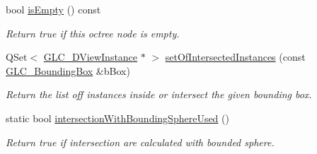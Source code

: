 \begin{DoxyCompactItemize}
bool \hyperlink{class_g_l_c___octree_node_ab70f05f3d3f1a8c5d13fce3a94869f79}{is\-Empty} () const 
\begin{DoxyCompactList}\small\item\em Return true if this octree node is empty. \end{DoxyCompactList}\item 
Q\-Set$<$ \hyperlink{class_g_l_c__3_d_view_instance}{G\-L\-C\-\_\-D\-View\-Instance} $\ast$ $>$ \hyperlink{class_g_l_c___octree_node_a8c5dc8fc4cf7fc48628264c446c410b5}{set\-Of\-Intersected\-Instances} (const \hyperlink{class_g_l_c___bounding_box}{G\-L\-C\-\_\-\-Bounding\-Box} \&b\-Box)
\begin{DoxyCompactList}\small\item\em Return the list off instances inside or intersect the given bounding box. \end{DoxyCompactList}\item 
static bool \hyperlink{class_g_l_c___octree_node_ad97985a4b9ec199cbbbe2a4d1d8f3e0e}{intersection\-With\-Bounding\-Sphere\-Used} ()
\begin{DoxyCompactList}\small\item\em Return true if intersection are calculated with bounded sphere. \end{DoxyCompactList}\end{DoxyCompactItemize}
